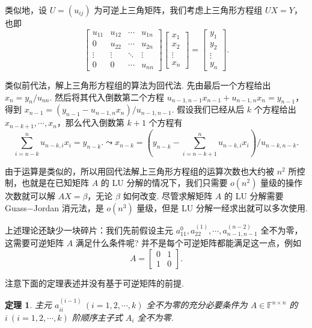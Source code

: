 \documentclass[10pt,openany]{article}
\theoremstyle{thmstyle} %
\newtheorem{theorem}{定理}[subsection]
\theoremstyle{defstyle} %
\theoremstyle{prostyle} %
\theoremstyle{exastyle}
\theoremstyle{remstyle}
\newcommand{\F}{\mathbb{F}}
\newcommand{\n}{^{n \times n}}
\begin{document}
类似地，设 \( U=(u_{ij}) \) 为可逆上三角矩阵，我们考虑上三角形方程组 \( UX=Y \)，也即
\[ \begin{bmatrix}
	u_{11} & u_{12} & \cdots & u_{1n} \\
	0 & u_{22} & \cdots & u_{2n} \\
	\vdots & \vdots & \ddots & \vdots \\
	0 & 0 & \cdots & u_{nn}
\end{bmatrix}\begin{bmatrix}
  x_1 \\ x_2 \\ \vdots \\ x_n
\end{bmatrix}=\begin{bmatrix}
y_1 \\ y_2 \\ \vdots \\ y_n
\end{bmatrix}. \]

类似前代法，解上三角形方程组的算法为回代法. 先由最后一个方程给出 \( x_n=y_n/u_{nn} \). 然后将其代入倒数第二个方程 \( u_{n-1,n-1}x_{n-1}+u_{n-1,n}x_n=y_{n-1} \)，得到 \( x_{n-1}=(y_{n-1}-u_{n-1,n}x_n)/u_{n-1,n-1} \). 假设我们已经从后 \( k \) 个方程给出 \( x_{n-k+1},\cdots,x_n \)，那么代入倒数第 \( k+1 \) 个方程有
\[ \sum_{i=n-k}^{n} u_{n-k,i}x_{i}=y_{n-k}. \leadsto x_{n-k}=\left( y_{n-k}-  \sum_{i=n-k+1}^{n} u_{n-k,i}x_{i} \right)/u_{n-k,n-k}.  \]

由于运算是类似的，所以用回代法解上三角形方程组的运算次数也大约被 \( n^2 \) 所控制，也就是在已知矩阵 \( A \) 的 LU 分解的情况下，我们只需要 \( o(n^2) \) 量级的操作次数就可以解 \( AX=\beta \)，无论 \( \beta \) 如何改变. 尽管求解矩阵 \( A \) 的 LU 分解需要 Guass\(-\)Jordan 消元法，是 \( o(n^3) \) 量级，但是 LU 分解一经求出就可以多次使用.

上述理论还缺少一块碎片：我们先前假设主元 \( a_{11}^{0}, a_{22}^{(1)},\cdots, a_{n-1,n-1}^{(n-2)} \) 全不为零，这需要可逆矩阵 \( A \) 满足什么条件呢? 并不是每个可逆矩阵都能满足这一点，例如
\[ A=\begin{bmatrix}
	0 & 1 \\
	1 & 0
\end{bmatrix}. \]

注意下面的定理表述并没有基于可逆矩阵的前提.

\begin{theorem} \label{4.3.11}
	主元 \( a_{ii}^{(i-1)} \ (i=1,2,\cdots,k) \) 全不为零的充分必要条件为 \( A \in \F\n \) 的 \( i \ (i=1,2,\cdots,k) \) 阶顺序主子式 \( A_i \) 全不为零.
\end{theorem}
\end{document}
